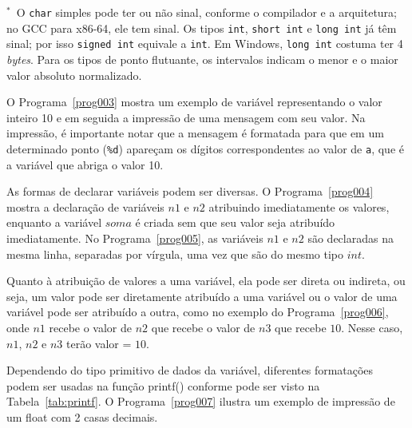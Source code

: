 \documentclass[11pt,fleqn]{book} %
\begin{document}
\noindent $^{*}$~O \texttt{char} simples pode ter ou não sinal, conforme o compilador e a arquitetura; no GCC para x86-64, ele tem sinal.
Os tipos \texttt{int}, \texttt{short int} e \texttt{long int} já têm sinal; por isso \texttt{signed int} equivale a \texttt{int}.
Em Windows, \texttt{long int} costuma ter 4 \textit{bytes}.
Para os tipos de ponto flutuante, os intervalos indicam o menor e o maior valor absoluto normalizado.

O Programa~\ref{prog003} mostra um exemplo de variável representando o valor inteiro 10 e em seguida a impressão de uma mensagem com seu valor.
Na impressão, é importante notar que a mensagem é formatada para que em um determinado ponto (\texttt{\%d}) apareçam os dígitos correspondentes ao valor de \texttt{a}, que é a variável que abriga o valor 10.



As formas de declarar variáveis podem ser diversas. O Programa~\ref{prog004} mostra a declaração de variáveis $n1$ e $n2$ atribuindo imediatamente os valores, enquanto a variável $soma$ é criada sem que seu valor seja atribuído imediatamente. No Programa~\ref{prog005}, as variáveis $n1$ e $n2$ são declaradas na mesma linha, separadas por vírgula, uma vez que são do mesmo tipo $int$.





Quanto à atribuição de valores a uma variável, ela pode ser direta ou indireta, ou seja, um valor pode ser diretamente atribuído a uma variável ou o valor de uma variável pode ser atribuído a outra, como no exemplo do Programa~\ref{prog006}, onde $n1$ recebe o valor de $n2$ que recebe o valor de $n3$ que recebe $10$. Nesse caso, $n1$, $n2$ e $n3$ terão valor = $10$.



Dependendo do tipo primitivo de dados da variável, diferentes formatações podem ser usadas na função printf() conforme pode ser visto na Tabela~\ref{tab:printf}. O Programa~\ref{prog007} ilustra um exemplo de impressão de um float com 2 casas decimais.


\end{document}
